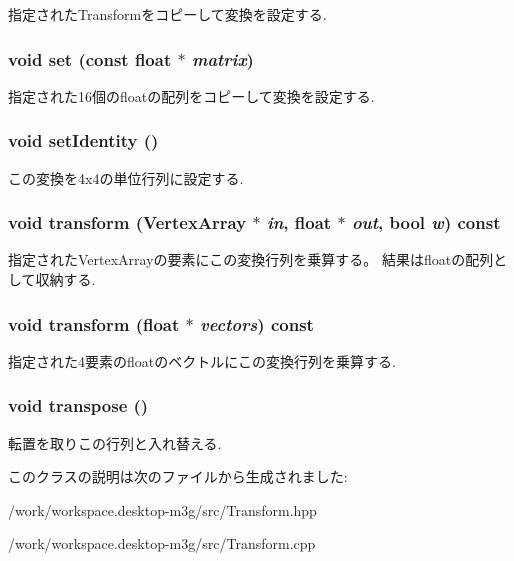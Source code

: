 指定されたTransformをコピーして変換を設定する. \hypertarget{classm3g_1_1Transform_d1a2203142a848286c80d66c8c7fa37d}{
\subsubsection[{set}]{\setlength{\rightskip}{0pt plus 5cm}void set (const float $\ast$ {\em matrix})}}
\label{classm3g_1_1Transform_d1a2203142a848286c80d66c8c7fa37d}


指定された16個のfloatの配列をコピーして変換を設定する. \hypertarget{classm3g_1_1Transform_382e6ad7e6721b121e510959e1011be3}{
\subsubsection[{setIdentity}]{\setlength{\rightskip}{0pt plus 5cm}void setIdentity ()}}
\label{classm3g_1_1Transform_382e6ad7e6721b121e510959e1011be3}


この変換を4x4の単位行列に設定する. \hypertarget{classm3g_1_1Transform_557e326db393b8a1ce23455978af32dc}{
\subsubsection[{transform}]{\setlength{\rightskip}{0pt plus 5cm}void transform ({\bf VertexArray} $\ast$ {\em in}, \/  float $\ast$ {\em out}, \/  bool {\em w}) const}}
\label{classm3g_1_1Transform_557e326db393b8a1ce23455978af32dc}


指定されたVertexArrayの要素にこの変換行列を乗算する。 結果はfloatの配列として収納する. \hypertarget{classm3g_1_1Transform_0b85978885624f651df63da4137692df}{
\subsubsection[{transform}]{\setlength{\rightskip}{0pt plus 5cm}void transform (float $\ast$ {\em vectors}) const}}
\label{classm3g_1_1Transform_0b85978885624f651df63da4137692df}


指定された4要素のfloatのベクトルにこの変換行列を乗算する. \hypertarget{classm3g_1_1Transform_f3a99ffb20127be48232d12260e934dc}{
\subsubsection[{transpose}]{\setlength{\rightskip}{0pt plus 5cm}void transpose ()}}
\label{classm3g_1_1Transform_f3a99ffb20127be48232d12260e934dc}


転置を取りこの行列と入れ替える. 

このクラスの説明は次のファイルから生成されました:\begin{CompactItemize}
\item 
/work/workspace.desktop-m3g/src/Transform.hpp\item 
/work/workspace.desktop-m3g/src/Transform.cpp\end{CompactItemize}

